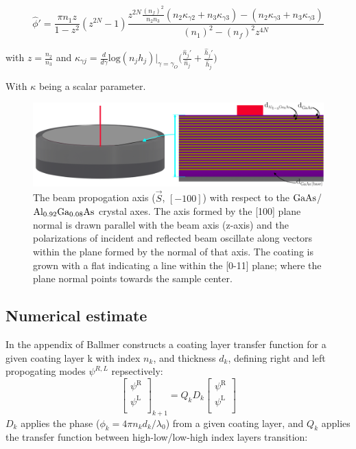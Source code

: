 \begin{equation}
\hat{\phi}' = \frac{\pi n_1 z}{1-z^2}(z^{2N} -1) \frac{z^{2N} \frac{(n_f)^2}{n_2 n_3}(n_2 \kappa_{\gamma 2} + n_3\kappa_{\gamma 3}) - (n_2 \kappa_{\gamma 3} + n_3\kappa_{\gamma 3})}{(n_1)^2 -(n_f)^2 z^{4N}}
\end{equation}

with $z = \frac{n_2}{n_3}$
and
$
\kappa_{\gamma j} = \frac{d}{d \gamma} \mathrm{log}(n_j h_j)|_{\gamma =\gamma_{O}} \bigg(\frac{\hat{n}_j'}{\hat{n}_j} +\frac{\hat{h}_j'}{\hat{h}_j} \bigg)
$

With $\kappa$ being a scalar parameter.

\begin{figure}[!ht]
	\includegraphics[width=\textwidth]{figs/ALGAAS/ALGAAS_HR_layers_ann.pdf}
\caption{The beam propogation axis ($\vec{S}$, $[-100]$) with respect to the $\mathrm{GaAs}$/$\mathrm{Al_{0.92}Ga_{0.08}As}$ crystal axes. The axis formed by the [100] plane normal is drawn parallel with the beam axis (z-axis) and the polarizations of incident and reflected beam oscillate along vectors within the plane formed by the normal of that axis. The coating is grown with a flat indicating a line within the [0-11] plane; where the plane normal points towards the sample center.}
\label{fig:HRlayers}
\end{figure}


\subsection{Numerical estimate}

In the appendix of \cite{ballmer:2015} Ballmer constructs a coating layer transfer function for a given coating layer k with index $n_k$, and thickness $d_k$, defining right and left propogating modes $\psi^{R,L}$ repsectively:
$$
  \left[ {\begin{array}{c}
   \psi^\mathrm{R} \\
   \psi^\mathrm{L} \\
  \end{array} } \right]_{k+1}
  =
%
Q_k D_k
%
 \left[{\begin{array}{c}
   \psi^\mathrm{R} \\
   \psi^\mathrm{L} \\
 \end{array}} \right]
$$
\noindent $D_k$ applies the phase ($\phi_k = 4\pi n_k d_k /\lambda_0$) from a given coating layer, and $Q_k$ applies the transfer function between high-low/low-high index layers transition:

